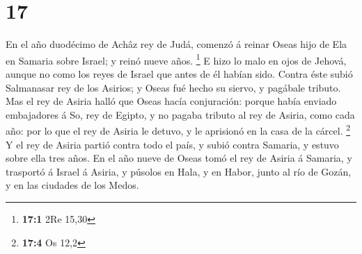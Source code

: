 \hypertarget{section-16}{%
\section{17}\label{section-16}}

 En el año duodécimo de Achâz rey de Judá, comenzó á reinar
Oseas hijo de Ela en Samaria sobre Israel; y reinó nueve años.
\footnote{\textbf{17:1} 2Re 15,30}  E hizo lo malo en ojos
de Jehová, aunque no como los reyes de Israel que antes de él habían
sido.  Contra éste subió Salmanasar rey de los Asirios; y
Oseas fué hecho su siervo, y pagábale tributo.  Mas el rey
de Asiria halló que Oseas hacía conjuración: porque había enviado
embajadores á So, rey de Egipto, y no pagaba tributo al rey de Asiria,
como cada año: por lo que el rey de Asiria le detuvo, y le aprisionó en
la casa de la cárcel. \footnote{\textbf{17:4} Os 12,2}  Y el
rey de Asiria partió contra todo el país, y subió contra Samaria, y
estuvo sobre ella tres años.  En el año nueve de Oseas tomó
el rey de Asiria á Samaria, y trasportó á Israel á Asiria, y púsolos en
Hala, y en Habor, junto al río de Gozán, y en las ciudades de los Medos.

